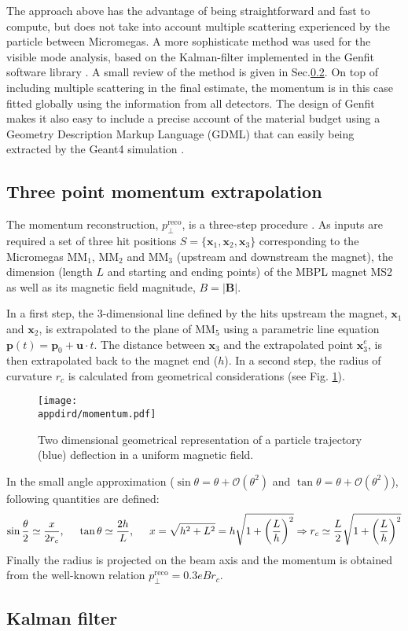 The approach above has the advantage of being straightforward and fast to compute, but does not take into account multiple scattering experienced by the particle between Micromegas. A more sophisticate method was used for the visible mode analysis, based on the Kalman-filter implemented in the Genfit software library \cite{genfit}. A small review of the method is given in Sec.\ref{appD:sec:kalman-filter}. On top of including multiple scattering in the final estimate, the momentum is in this case fitted globally using the information from all detectors. The design of Genfit makes it also easy to include a precise account of the material budget using a Geometry Description Markup Language (GDML) that can easily being extracted by the Geant4 simulation \cite{gdml}.

\subsection{Three point momentum extrapolation}
\label{appD:sec:mom-reco-simple}

The momentum reconstruction, $p_\perp^\text{reco}$, is a three-step procedure \cite{na64-muon-note}. As inputs are required a set of three hit positions $S=\{\mathbf{x}_1,\mathbf{x}_2,\mathbf{x}_3\}$ corresponding to the Micromegas MM$_1$, MM$_2$ and MM$_3$ (upstream and downstream the magnet), the dimension (length $L$ and starting and ending points) of the MBPL magnet MS2 as well as its magnetic field magnitude, $B=|\mathbf{B}|$.

In a first step, the 3-dimensional line defined by the hits upstream the magnet, $\mathbf{x}_1$ and $\mathbf{x}_2$, is extrapolated to the plane of MM$_5$ using a parametric line equation $\mathbf{p}(t)=\mathbf{p}_0+\mathbf{u}\cdot t$. The distance between $\mathbf{x}_3$ and the extrapolated point $\mathbf{x}_3^{e}$, is then extrapolated back to the magnet end ($h$). In a second step, the radius of curvature $r_c$ is calculated from geometrical considerations (see Fig. \ref{fig:momentumgeo}).
\begin{figure}[tbh!]
    \centering
    \texttt{[image: \\appdird/momentum.pdf]}
    \caption{Two dimensional geometrical representation of a particle trajectory (blue) deflection in a uniform magnetic field.}
    \label{fig:momentumgeo}
\end{figure}
In the small angle approximation ($\sin\theta=\theta+\mathcal{O}(\theta^2)$ and $\tan\theta=\theta+\mathcal{O}(\theta^2)$), following quantities are defined:
\begin{equation}
  \label{eq:mom-simple}
        \sin\frac{\theta}{2}\simeq\frac{x}{2r_c},\hspace{5mm}
        \tan\theta\simeq\frac{2h}{L},\hspace{5mm}x=\sqrt{h^2+L^2}=h\sqrt{1+\left(\frac{L}{h}\right)^2}\Rightarrow r_c\simeq\frac{L}{2}\sqrt{1+\left(\frac{L}{h}\right)^2}
\end{equation}
Finally the radius is projected on the beam axis and the momentum is obtained from the well-known relation $p_\perp^\text{reco}=0.3eBr_c$. 
\subsection{Kalman filter}
\label{appD:sec:kalman-filter}

